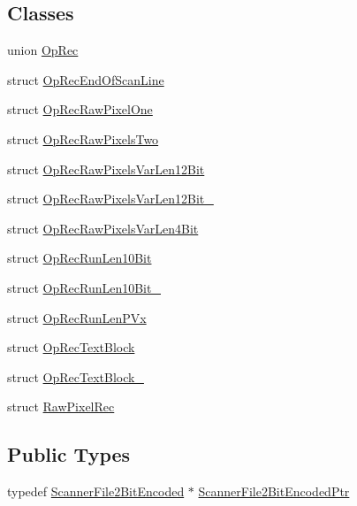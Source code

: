 \subsection*{Classes}
\begin{DoxyCompactItemize}
\item 
union \hyperlink{union_scanner_file2_bit_encoded_1_1_op_rec}{Op\+Rec}
\item 
struct \hyperlink{struct_scanner_file2_bit_encoded_1_1_op_rec_end_of_scan_line}{Op\+Rec\+End\+Of\+Scan\+Line}
\item 
struct \hyperlink{struct_scanner_file2_bit_encoded_1_1_op_rec_raw_pixel_one}{Op\+Rec\+Raw\+Pixel\+One}
\item 
struct \hyperlink{struct_scanner_file2_bit_encoded_1_1_op_rec_raw_pixels_two}{Op\+Rec\+Raw\+Pixels\+Two}
\item 
struct \hyperlink{struct_scanner_file2_bit_encoded_1_1_op_rec_raw_pixels_var_len12_bit}{Op\+Rec\+Raw\+Pixels\+Var\+Len12\+Bit}
\item 
struct \hyperlink{struct_scanner_file2_bit_encoded_1_1_op_rec_raw_pixels_var_len12_bit__2}{Op\+Rec\+Raw\+Pixels\+Var\+Len12\+Bit\+\_}
\item 
struct \hyperlink{struct_scanner_file2_bit_encoded_1_1_op_rec_raw_pixels_var_len4_bit}{Op\+Rec\+Raw\+Pixels\+Var\+Len4\+Bit}
\item 
struct \hyperlink{struct_scanner_file2_bit_encoded_1_1_op_rec_run_len10_bit}{Op\+Rec\+Run\+Len10\+Bit}
\item 
struct \hyperlink{struct_scanner_file2_bit_encoded_1_1_op_rec_run_len10_bit__2}{Op\+Rec\+Run\+Len10\+Bit\+\_}
\item 
struct \hyperlink{struct_scanner_file2_bit_encoded_1_1_op_rec_run_len_p_vx}{Op\+Rec\+Run\+Len\+P\+Vx}
\item 
struct \hyperlink{struct_scanner_file2_bit_encoded_1_1_op_rec_text_block}{Op\+Rec\+Text\+Block}
\item 
struct \hyperlink{struct_scanner_file2_bit_encoded_1_1_op_rec_text_block__2}{Op\+Rec\+Text\+Block\+\_}
\item 
struct \hyperlink{struct_scanner_file2_bit_encoded_1_1_raw_pixel_rec}{Raw\+Pixel\+Rec}
\end{DoxyCompactItemize}
\subsection*{Public Types}
\begin{DoxyCompactItemize}
\item 
typedef \hyperlink{class_k_k_l_s_c_1_1_scanner_file2_bit_encoded}{Scanner\+File2\+Bit\+Encoded} $\ast$ \hyperlink{class_k_k_l_s_c_1_1_scanner_file2_bit_encoded_a7cf72359f00a78ee199521a98119b2f4}{Scanner\+File2\+Bit\+Encoded\+Ptr}
\end{DoxyCompactItemize}
